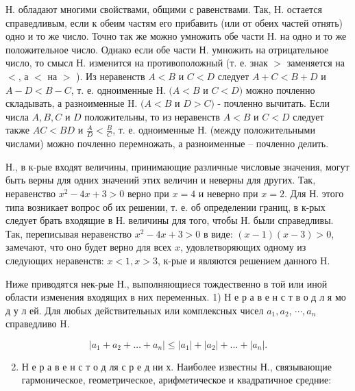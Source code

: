 \documentclass[10pt]{article}
\begin{document}
Н. обладают многими свойствами, общими с равенствами. Так, Н. остается справедливым, если к обеим частям его прибавить (или от обеих частей отнять) одно и то же число. Точно так же можно умножить обе части Н. на одно и то же положительное число. Однако если обе части Н. умножить на отрицательное число, то смысл Н. изменится на противоположный (т. е. знак $>$ заменяется на $<$, а $<$ на $>$ ). Из неравенств $A<B$ и $C<D$ следует $A+C<B+D$ и $A-D<B-C$, т. е. одноименные Н. $(A<B$ и $C<D)$ можно почленно складывать, а разноименные H. $(A<B$ и $D>C)$ - почленно вычитать. Если числа $A, B, C$ и $D$ положительны, то из неравенств $A<B$ и $C<D$ следует также $A C<B D$ и $\frac{A}{D}<\frac{B}{C}$, т. е. одноименные Н. (между положительными числами) можно почленно перемножать, а разноименные -- почленно делить.



Н., в к-рые входят величины, принимающие различные числовые значения, могут быть верны для одних значений этих величин и неверны для других. Так, неравенство $x^{2}-4 x+3>0$ верно при $x=4$ и неверно при $x=2$. Для Н. этого типа возникает вопрос об их решении, т. е. об определении границ, в к-рых следует брать входящие в Н. величины для того, чтобы Н. были справедливы. Так, переписывая неравенство $x^{2}-4 x+3>0$ в виде: $(x-1)(x-3)>0$, замечают, что оно будет верно для всех $x$, удовлетворяющих одному из следующих неравенств: $x<1, x>3$, к-рые и являются решением данного $\mathrm{H}$.



Ниже приводятся нек-рые Н., выполняющиеся тождественно в той или иной области изменения входящих в них переменных. 1) Н е р а в е н с т в о д л я мо д у л ей. Для любых действительных или комплексных чисел $a_{1}, a_{2}$, $\cdots, a_{n}$ справедливо $\mathrm{H}$.



\[

\left|a_{1}+a_{2}+\ldots+a_{n}\right| \leqslant\left|a_{1}\right|+\left|a_{2}\right|+\ldots+\left|a_{n}\right| .

\]



\begin{enumerate}

  \setcounter{enumi}{1}

  \item Н е р а в е н с т о д ля с р е д ни х. Наиболее известны Н., связывающие гармоническое, геометрическое, арифметическое и квадратичное средние:

\end{enumerate}
\end{document}
